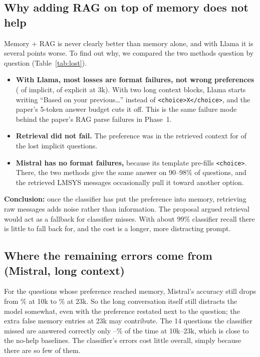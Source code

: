 \documentclass[11pt,a4paper]{article}
\begin{document}
\subsection{Why adding RAG on top of memory does not help}\label{sec:whyrag}
Memory + RAG is never clearly better than memory alone, and with Llama it is several points worse. To find out why, we compared the two methods
question by question (Table~\ref{tab:lost}).
\begin{table}[H]
\centering\small
\resizebox{\linewidth}{!}{}
\caption{Questions answered correctly by memory but not by memory + RAG (``Lost''), split into format failures (no parseable
\texttt{<choice>}) and a wrong option. ``Pref.\ retrieved'' = the preference was in the retrieved top~5. ``Gained'' = the reverse case.}
\label{tab:lost}
\end{table}
\begin{itemize}
  \item \textbf{With Llama, most losses are format failures, not wrong preferences} (\qLostImParse{} of \qLostIm{} implicit, \qLostExParse{}
        of \qLostEx{} explicit at 3k). With two long context blocks, Llama starts writing ``Based on your previous\ldots'' instead of
        \texttt{<choice>X</choice>}, and the paper's 5-token answer budget cuts it off. This is the same failure mode behind the paper's RAG parse failures in Phase~1.
  \item \textbf{Retrieval did not fail.} The preference was in the retrieved context for \qLostImGold{} of the \qLostIm{} lost implicit questions.
  \item \textbf{Mistral has no format failures,} because its template pre-fills \texttt{<choice>}. There, the two methods give the same answer on
        90--98\% of questions, and the retrieved LMSYS messages occasionally pull it toward another option.
\end{itemize}
\textbf{Conclusion:} once the classifier has put the preference into memory, retrieving raw messages adds noise rather than information. The proposal
argued retrieval would act as a fallback for classifier misses. With about 99\% classifier recall there is little to fall back for, and the cost is
a longer, more distracting prompt.

\subsection{Where the remaining errors come from (Mistral, long context)}
For the questions whose preference reached memory, Mistral's accuracy still drops from \qMiCondTen\% at 10k to \qMiCondTwentyThree\% at 23k. So
the long conversation itself still distracts the model somewhat, even with the preference restated next to the question; the extra false memory
entries at 23k may contribute. The 14 questions the classifier missed are answered correctly only \qMiMissAccLo--\qMiMissAccHi\% of the time at
10k--23k, which is close to the no-help baselines. The classifier's errors cost little overall, simply because there are so few of them.
\end{document}
